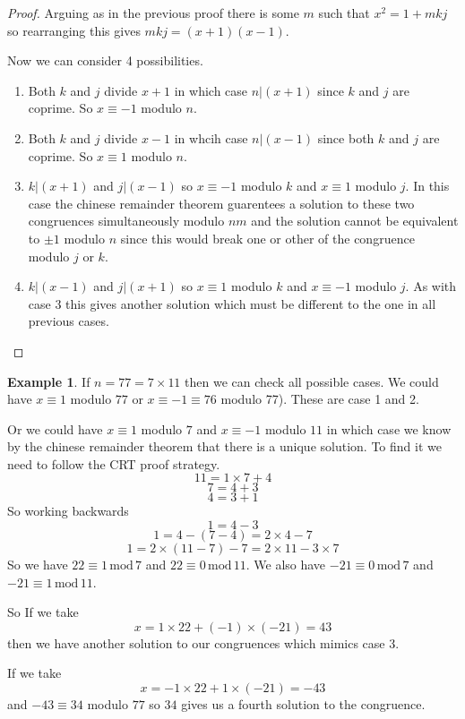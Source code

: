 \documentclass[
]{book}
\theoremstyle{definition}
\theoremstyle{definition}
\newtheorem{example}{Example}[chapter]
\theoremstyle{definition}
\theoremstyle{definition}
\theoremstyle{remark}
\begin{document}
\begin{proof}

Arguing as in the previous proof there is some \(m\) such that \(x^2 = 1 + mkj\) so rearranging this gives \(mkj = (x+1)(x-1)\).

Now we can consider 4 possibilities.

\begin{enumerate}
\def\labelenumi{\arabic{enumi}.}
\item
  Both \(k\) and \(j\) divide \(x+1\) in which case \(n|(x+1)\) since \(k\) and \(j\) are coprime. So \(x \equiv -1\) modulo \(n\).
\item
  Both \(k\) and \(j\) divide \(x-1\) in whcih case \(n|(x-1)\) since both \(k\) and \(j\) are coprime. So \(x \equiv 1\) modulo \(n\).
\item
  \(k|(x+1)\) and \(j|(x-1)\) so \(x \equiv -1\) modulo \(k\) and \(x \equiv 1\) modulo \(j\). In this case the chinese remainder theorem guarentees a solution to these two congruences simultaneously modulo \(nm\) and the solution cannot be equivalent to \(\pm 1\) modulo \(n\) since this would break one or other of the congruence modulo \(j\) or \(k\).
\item
  \(k|(x-1)\) and \(j|(x+1)\) so \(x \equiv 1\) modulo \(k\) and \(x \equiv -1\) modulo \(j\). As with case \(3\) this gives another solution which must be different to the one in all previous cases.
\end{enumerate}

\end{proof}

\begin{example}
If \(n=77 = 7 \times 11\) then we can check all possible cases. We could have \(x \equiv 1\) modulo \(77\) or \(x \equiv -1 \equiv 76\) modulo 77). These are case 1 and 2.

Or we could have \(x \equiv 1\) modulo \(7\) and \(x \equiv -1\) modulo \(11\) in which case we know by the chinese remainder theorem that there is a unique solution. To find it we need to follow the CRT proof strategy.
\[11= 1\times 7 +4\]
\[ 7 = 4 +3\]
\[4 = 3+1\]
So working backwards
\[ 1=4-3\]
\[ 1= 4 - (7-4) = 2 \times 4 -7\]
\[ 1= 2\times(11-7) -7 = 2\times 11 -3\times 7\]
So we have \(22\equiv 1 \, \mbox{mod} \,7\) and \(22 \equiv 0 \,\mbox{mod}\, 11\). We also have \(-21 \equiv 0 \, \mbox{mod} \,7\) and \(-21 \equiv 1 \, \mbox{mod} \,11\).

So If we take
\[ x = 1 \times 22 + (-1)\times (-21) = 43 \] then we have another solution to our congruences which mimics case 3.

If we take
\[ x=-1 \times 22 + 1 \times (-21) = -43\] and \(-43 \equiv 34\) modulo \(77\) so \(34\) gives us a fourth solution to the congruence.
\end{example}
\end{document}

